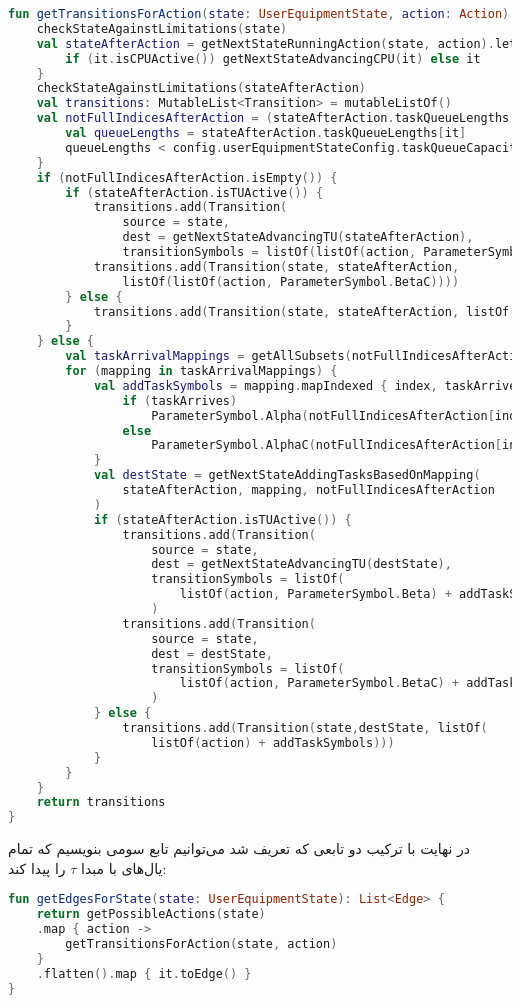 \begin{latin}
	\begin{lstlisting}[language=Kotlin, title=\rl{تابع محاسبه‌ی کنش‌های ممکن به ازای حالت داده شده}]
fun getTransitionsForAction(state: UserEquipmentState, action: Action): List<Transition> {
	checkStateAgainstLimitations(state)
	val stateAfterAction = getNextStateRunningAction(state, action).let {
		if (it.isCPUActive()) getNextStateAdvancingCPU(it) else it
	}
	checkStateAgainstLimitations(stateAfterAction)
	val transitions: MutableList<Transition> = mutableListOf()
	val notFullIndicesAfterAction = (stateAfterAction.taskQueueLengths.indices).filter {
		val queueLengths = stateAfterAction.taskQueueLengths[it]
		queueLengths < config.userEquipmentStateConfig.taskQueueCapacity
	}
	if (notFullIndicesAfterAction.isEmpty()) {
		if (stateAfterAction.isTUActive()) {
			transitions.add(Transition(
				source = state, 
				dest = getNextStateAdvancingTU(stateAfterAction), 
				transitionSymbols = listOf(listOf(action, ParameterSymbol.Beta))))
			transitions.add(Transition(state, stateAfterAction, 
				listOf(listOf(action, ParameterSymbol.BetaC))))
		} else {
			transitions.add(Transition(state, stateAfterAction, listOf(listOf(action))))
		}
	} else {
		val taskArrivalMappings = getAllSubsets(notFullIndicesAfterAction.size)
		for (mapping in taskArrivalMappings) {
			val addTaskSymbols = mapping.mapIndexed { index, taskArrives ->
				if (taskArrives)
					ParameterSymbol.Alpha(notFullIndicesAfterAction[index])
				else
					ParameterSymbol.AlphaC(notFullIndicesAfterAction[index])
			}
			val destState = getNextStateAddingTasksBasedOnMapping(
				stateAfterAction, mapping, notFullIndicesAfterAction
			)
			if (stateAfterAction.isTUActive()) {
				transitions.add(Transition(
					source = state,
					dest = getNextStateAdvancingTU(destState),
					transitionSymbols = listOf(
						listOf(action, ParameterSymbol.Beta) + addTaskSymbols))
					)
				transitions.add(Transition(
					source = state,
					dest = destState,
					transitionSymbols = listOf(
						listOf(action, ParameterSymbol.BetaC) + addTaskSymbols))
					)
			} else {
				transitions.add(Transition(state,destState, listOf(
					listOf(action) + addTaskSymbols)))
			}
		}
	}
	return transitions
}
	\end{lstlisting}
\end{latin}
\newpage
در نهایت با ترکیب دو تابعی که تعریف شد می‌توانیم تابع سومی بنویسیم که تمام یال‌های با مبدا $\tau$ را پیدا کند:
\begin{latin}
	\begin{lstlisting}[language=Kotlin, title=\rl{تابع محاسبه‌ی یال‌های زنجیره به ازای حالت مبدا ورودی}]
fun getEdgesForState(state: UserEquipmentState): List<Edge> {
	return getPossibleActions(state)
	.map { action ->
		getTransitionsForAction(state, action)
	}
	.flatten().map { it.toEdge() }
}
	\end{lstlisting}
\end{latin}
\clearpage